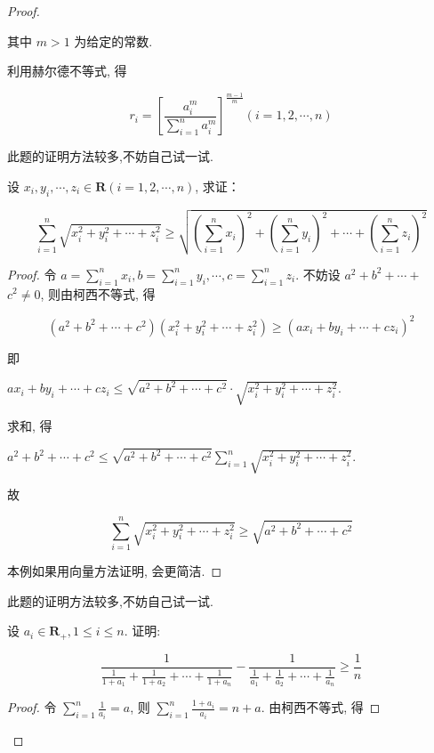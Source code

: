 \begin{proof}
\begin{solution}
	其中 $m>1$ 为给定的常数.
	
	利用赫尔德不等式, 得
	
	$$
	r_{i}=\left[\frac{a_{i}^{m}}{\sum_{i=1}^{n} a_{i}^{m}}\right]^{\frac{m-1}{m}}(i=1,2, \cdots, n)
	$$
\end{solution}
\begin{note}
	此题的证明方法较多,不妨自己试一试.
\end{note}

\begin{example}
	设 $x_{i}, y_{i}, \cdots, z_{i} \in \mathbf{R}(i=1,2, \cdots, n)$, 求证：
	
	$$
	\sum_{i=1}^{n} \sqrt{x_{i}^{2}+y_{i}^{2}+\cdots+z_{i}^{2}} \geqslant \sqrt{\left(\sum_{i=1}^{n} x_{i}\right)^{2}+\left(\sum_{i=1}^{n} y_{i}\right)^{2}+\cdots+\left(\sum_{i=1}^{n} z_{i}\right)^{2}}
	$$
\end{example}
\begin{proof}
	令 $a=\sum_{i=1}^{n} x_{i}, b=\sum_{i=1}^{n} y_{i}, \cdots, c=\sum_{i=1}^{n} z_{i}$. 不妨设 $a^{2}+b^{2}+\cdots+$ $c^{2} \neq 0$, 则由柯西不等式, 得
	
	$$
	\left(a^{2}+b^{2}+\cdots+c^{2}\right)\left(x_{i}^{2}+y_{i}^{2}+\cdots+z_{i}^{2}\right) \geqslant\left(a x_{i}+b y_{i}+\cdots+c z_{i}\right)^{2}
	$$
	
	即
	
	$a x_{i}+b y_{i}+\cdots+c z_{i} \leqslant \sqrt{a^{2}+b^{2}+\cdots+c^{2}} \cdot \sqrt{x_{i}^{2}+y_{i}^{2}+\cdots+z_{i}^{2}}$.
	
	求和, 得
	
	$a^{2}+b^{2}+\cdots+c^{2} \leqslant \sqrt{a^{2}+b^{2}+\cdots+c^{2}} \sum_{i=1}^{n} \sqrt{x_{i}^{2}+y_{i}^{2}+\cdots+z_{i}^{2}}$.
	
	故
	
	$$
	\sum_{i=1}^{n} \sqrt{x_{i}^{2}+y_{i}^{2}+\cdots+z_{i}^{2}} \geqslant \sqrt{a^{2}+b^{2}+\cdots+c^{2}}
	$$
	
	本例如果用向量方法证明, 会更简洁.
\end{proof}
\begin{note}
	此题的证明方法较多,不妨自己试一试.
\end{note}

\begin{example}
	设 $a_{i} \in \mathbf{R}_{+}, 1 \leqslant i \leqslant n$. 证明:
	
	$$
	\frac{1}{\frac{1}{1+a_{1}}+\frac{1}{1+a_{2}}+\cdots+\frac{1}{1+a_{n}}}-\frac{1}{\frac{1}{a_{1}}+\frac{1}{a_{2}}+\cdots+\frac{1}{a_{n}}} \geqslant \frac{1}{n}
	$$
\end{example}
\begin{proof}
	令 $\sum_{i=1}^{n} \frac{1}{a_{i}}=a$, 则 $\sum_{i=1}^{n} \frac{1+a_{i}}{a_{i}}=n+a$. 由柯西不等式, 得
	

\end{proof}
\end{proof}
